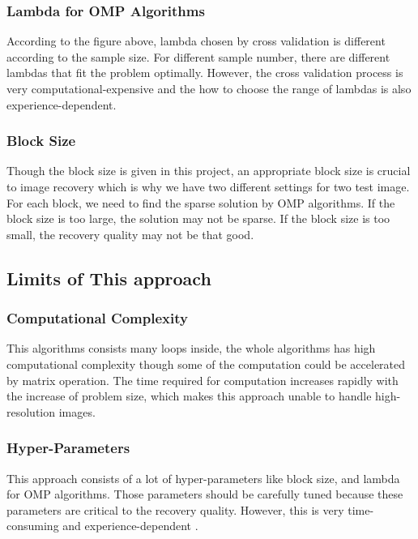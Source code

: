 \documentclass{article}
\begin{document}
\subsubsection{Lambda for OMP Algorithms}
According to the figure above, lambda chosen by cross validation is different according to the sample size. For different sample number, there are different lambdas that fit the problem optimally. However, the cross validation process is very computational-expensive and the how to choose the range of lambdas is also experience-dependent. 
\subsubsection{Block Size}
Though the block size is given in this project, an appropriate block size is crucial to image recovery which is why we have two different settings for two test image. For each block, we need to find the sparse solution by OMP algorithms. If the block size is too large, the solution may not be sparse. If the block size is too small, the recovery quality may not be that good.

\subsection{Limits of This approach}
\subsubsection{Computational Complexity}
This algorithms consists many loops inside, the whole algorithms has high computational complexity though some of the computation could be accelerated by matrix operation. The time required for computation increases rapidly with the increase of problem size, which makes this approach unable to handle high-resolution images.
\subsubsection{Hyper-Parameters}
This approach consists of a lot of hyper-parameters like block size, and lambda for OMP algorithms. Those parameters should be carefully tuned because these parameters are critical to the recovery quality. However, this is very time-consuming and experience-dependent . 
\end{document}
